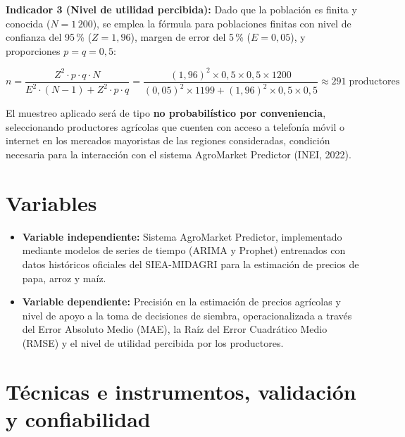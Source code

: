 \documentclass[12pt, a4paper]{report}
\begin{document}
\textbf{Indicador 3 (Nivel de utilidad percibida):} Dado que la población es finita y conocida ($N = 1\,200$), se emplea la fórmula para poblaciones finitas con nivel de confianza del 95\,\% ($Z = 1{,}96$), margen de error del 5\,\% ($E = 0{,}05$), y proporciones $p = q = 0{,}5$:

\begin{equation}
  n = \frac{Z^2 \cdot p \cdot q \cdot N}{E^2 \cdot (N-1) + Z^2 \cdot p \cdot q}
    = \frac{(1{,}96)^2 \times 0{,}5 \times 0{,}5 \times 1200}
           {(0{,}05)^2 \times 1199 + (1{,}96)^2 \times 0{,}5 \times 0{,}5}
    \approx 291 \;\text{productores}
\end{equation}

El muestreo aplicado será de tipo \textbf{no probabilístico por conveniencia}, seleccionando productores agrícolas que cuenten con acceso a telefonía móvil o internet en los mercados mayoristas de las regiones consideradas, condición necesaria para la interacción con el sistema AgroMarket Predictor (INEI, 2022).

\section{Variables}

\begin{itemize}
  \item \textbf{Variable independiente:} Sistema AgroMarket Predictor, implementado mediante modelos de series de tiempo (ARIMA y Prophet) entrenados con datos históricos oficiales del SIEA-MIDAGRI para la estimación de precios de papa, arroz y maíz.

  \item \textbf{Variable dependiente:} Precisión en la estimación de precios agrícolas y nivel de apoyo a la toma de decisiones de siembra, operacionalizada a través del Error Absoluto Medio (MAE), la Raíz del Error Cuadrático Medio (RMSE) y el nivel de utilidad percibida por los productores.
\end{itemize}

\section{Técnicas e instrumentos, validación y confiabilidad}

\vspace{0.5cm}
\end{document}
